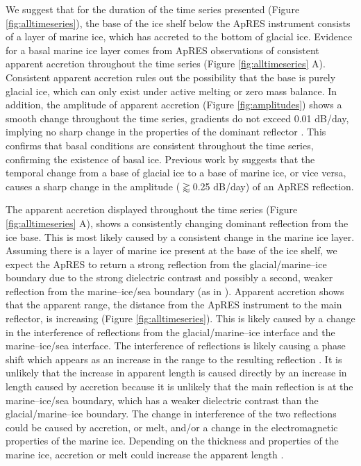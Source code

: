 We suggest that for the duration of the time series presented (Figure \ref{fig:alltimeseries}), the base of the  ice shelf below the ApRES instrument consists of a layer of marine ice, which has accreted to the bottom of glacial ice. Evidence for a basal marine ice layer comes from ApRES observations of consistent apparent accretion throughout the time series (Figure \ref{fig:alltimeseries} A). Consistent apparent accretion rules out the possibility that the base is purely glacial ice, which can only exist under active melting or zero mass balance.
In addition, the amplitude of apparent accretion (Figure \ref{fig:amplitudes}) shows a smooth change throughout the time series, gradients do not exceed 0.01 dB/day, implying no sharp change in the properties of the dominant reflector  \citep{vavnkova2021nature}. This confirms that basal conditions are consistent throughout the time series, confirming the existence of basal ice. Previous work by \cite{vavnkova2021nature} suggests that the temporal change from a base of glacial ice to a base of marine ice, or vice versa, causes a sharp change in the amplitude ($\gtrapprox$0.25 dB/day) of an ApRES reflection. 

The apparent accretion displayed throughout the time series (Figure \ref{fig:alltimeseries} A), shows a consistently changing dominant reflection from the ice base. This is most likely caused by a consistent change in the marine ice layer. 
Assuming there is a layer of marine ice present at the base of the  ice shelf, we expect the ApRES to return a strong reflection from the glacial/marine--ice boundary due to the strong dielectric contrast and possibly a second, weaker reflection from the marine--ice/sea boundary (as in \cite{fricker2001distribution}).
Apparent accretion shows that the apparent range, the distance from the ApRES instrument to the main reflector, is increasing (Figure \ref{fig:alltimeseries}). This is likely caused by a change in the interference of reflections from the glacial/marine--ice interface and the marine--ice/sea interface. The interference of reflections is likely causing a phase shift which appears as an increase in the range to the resulting reflection \citep{vavnkova2021nature}. It is unlikely that the increase in apparent length is caused directly by an increase in length caused by accretion because it is unlikely that the main reflection is at the marine--ice/sea boundary, which has a weaker dielectric contrast than the glacial/marine--ice boundary.
The change in interference of the two reflections could be caused by accretion, or melt, and/or a change in the electromagnetic properties of the marine ice. Depending on the thickness and properties of the marine ice, accretion or melt could increase the apparent length \citep{vavnkova2021nature}.

